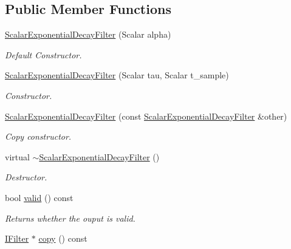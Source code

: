 \subsection*{Public Member Functions}
\begin{DoxyCompactItemize}
\item 
\hyperlink{classow__core_1_1ScalarExponentialDecayFilter_a3106080edb13cb1fd470bf82affb3bd8}{Scalar\+Exponential\+Decay\+Filter} (Scalar alpha)
\begin{DoxyCompactList}\small\item\em Default Constructor. \end{DoxyCompactList}\item 
\hyperlink{classow__core_1_1ScalarExponentialDecayFilter_a0245953fdfd03d0c10e499c9fdd17dc0}{Scalar\+Exponential\+Decay\+Filter} (Scalar tau, Scalar t\+\_\+sample)
\begin{DoxyCompactList}\small\item\em Constructor. \end{DoxyCompactList}\item 
\hyperlink{classow__core_1_1ScalarExponentialDecayFilter_a306b9507eeb2ca74590c4182ec90dcf4}{Scalar\+Exponential\+Decay\+Filter} (const \hyperlink{classow__core_1_1ScalarExponentialDecayFilter}{Scalar\+Exponential\+Decay\+Filter} \&other)\hypertarget{classow__core_1_1ScalarExponentialDecayFilter_a306b9507eeb2ca74590c4182ec90dcf4}{}\label{classow__core_1_1ScalarExponentialDecayFilter_a306b9507eeb2ca74590c4182ec90dcf4}

\begin{DoxyCompactList}\small\item\em Copy constructor. \end{DoxyCompactList}\item 
virtual \hyperlink{classow__core_1_1ScalarExponentialDecayFilter_a2be844d6f11d619580c51ecc6e247275}{$\sim$\+Scalar\+Exponential\+Decay\+Filter} ()\hypertarget{classow__core_1_1ScalarExponentialDecayFilter_a2be844d6f11d619580c51ecc6e247275}{}\label{classow__core_1_1ScalarExponentialDecayFilter_a2be844d6f11d619580c51ecc6e247275}

\begin{DoxyCompactList}\small\item\em Destructor. \end{DoxyCompactList}\item 
bool \hyperlink{classow__core_1_1ScalarExponentialDecayFilter_a596c6b0c7cd9b897d2a48c2174ab02a0}{valid} () const 
\begin{DoxyCompactList}\small\item\em Returns whether the ouput is valid. \end{DoxyCompactList}\item 
\hyperlink{classow__core_1_1IScalarFilter}{I\+Filter} $\ast$ \hyperlink{classow__core_1_1ScalarExponentialDecayFilter_aa477fd8142e2bd950a1fce0edb86911d}{copy} () const \hypertarget{classow__core_1_1ScalarExponentialDecayFilter_aa477fd8142e2bd950a1fce0edb86911d}{}\label{classow__core_1_1ScalarExponentialDecayFilter_aa477fd8142e2bd950a1fce0edb86911d}


\end{DoxyCompactItemize}
